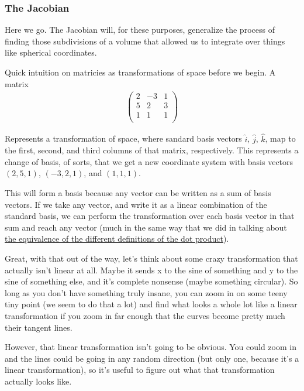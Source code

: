 \documentclass[12pt, letterpaper]{article}
\begin{document}
\subsubsection{The Jacobian}
Here we go. 
The Jacobian will, for these purposes, generalize the process of finding those subdivisions of a volume that allowed us to integrate over things like spherical coordinates.

Quick intuition on matricies as transformations of space before we begin.
A matrix
\begin{gather*}
    \begin{pmatrix}
        2 & -3 & 1\\
        5 & 2 & 3\\
        1 & 1 & 1\\
    \end{pmatrix}
\end{gather*}

Represents a transformation of space, where sandard basis vectors $\hat{i}$, $\hat{j}$, $\hat{k}$,
map to the first, second, and third columns of that matrix, respectively.
This represents a change of basis, of sorts, that we get a new coordinate system with basis vectors
$(2, 5, 1)$, $(-3, 2, 1)$, and $(1, 1, 1)$.

This will form a basis because any vector can be written as a sum of basis vectors.
If we take any vector, and write it as a linear combination of the standard basis, we can perform the transformation over each basis vector in that sum and reach any vector
(much in the same way that we did in talking about \hyperref[equOfDotProductDefinitions]{the equivalence of the different definitions of the dot product}).

Great, with that out of the way, let's think about some crazy transformation that actually isn't linear at all.
Maybe it sends x to the sine of something and y to the sine of something else, and it's complete nonsense (maybe something circular).
So long as you don't have something truly insane, you can zoom in on some teeny tiny point (we seem to do that a lot)
and find what looks a whole lot like a linear transformation if you zoom in far enough that the curves become pretty much their tangent lines.

However, that linear transformation isn't going to be obvious. 
You could zoom in and the lines could be going in any random direction (but only one, because it's a linear transformation), so it's useful to figure out what that transformation actually looks like.
\end{document}
